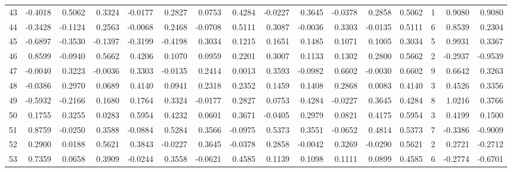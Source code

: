\begin{tabular}{lrrrrrrrrrrrrrrr}
43  &     -0.4018 &  0.5062 &  0.3324 & -0.0177 &  0.2827 &  0.0753 &  0.4284 & -0.0227 &  0.3645 & -0.0378 &   0.2858 &     0.5062 &      1 &                    0.9080 &                     0.9080 \\
44  &     -0.3428 & -0.1124 &  0.2563 & -0.0068 &  0.2468 & -0.0708 &  0.5111 &  0.3087 & -0.0036 &  0.3303 &  -0.0135 &     0.5111 &      6 &                    0.8539 &                     0.2304 \\
45  &     -0.6897 & -0.3530 & -0.1397 & -0.3199 & -0.4198 &  0.3034 &  0.1215 &  0.1651 &  0.1485 &  0.1071 &   0.1005 &     0.3034 &      5 &                    0.9931 &                     0.3367 \\
46  &      0.8599 & -0.0940 &  0.5662 &  0.4206 &  0.1070 &  0.0959 &  0.2201 &  0.3007 &  0.1133 &  0.1302 &   0.2800 &     0.5662 &      2 &                   -0.2937 &                    -0.9539 \\
47  &     -0.0040 &  0.3223 & -0.0036 &  0.3303 & -0.0135 &  0.2414 &  0.0013 &  0.3593 & -0.0982 &  0.6602 &  -0.0030 &     0.6602 &      9 &                    0.6642 &                     0.3263 \\
48  &     -0.0386 &  0.2970 &  0.0689 &  0.4140 &  0.0941 &  0.2318 &  0.2352 &  0.1459 &  0.1408 &  0.2868 &   0.0083 &     0.4140 &      3 &                    0.4526 &                     0.3356 \\
49  &     -0.5932 & -0.2166 &  0.1680 &  0.1764 &  0.3324 & -0.0177 &  0.2827 &  0.0753 &  0.4284 & -0.0227 &   0.3645 &     0.4284 &      8 &                    1.0216 &                     0.3766 \\
50  &      0.1755 &  0.3255 &  0.0283 &  0.5954 &  0.4232 &  0.0601 &  0.3671 & -0.0405 &  0.2979 &  0.0821 &   0.4175 &     0.5954 &      3 &                    0.4199 &                     0.1500 \\
51  &      0.8759 & -0.0250 &  0.3588 & -0.0884 &  0.5284 &  0.3566 & -0.0975 &  0.5373 &  0.3551 & -0.0652 &   0.4814 &     0.5373 &      7 &                   -0.3386 &                    -0.9009 \\
52  &      0.2900 &  0.0188 &  0.5621 &  0.3843 & -0.0227 &  0.3645 & -0.0378 &  0.2858 & -0.0042 &  0.3269 &  -0.0290 &     0.5621 &      2 &                    0.2721 &                    -0.2712 \\
53  &      0.7359 &  0.0658 &  0.3909 & -0.0244 &  0.3558 & -0.0621 &  0.4585 &  0.1139 &  0.1098 &  0.1111 &   0.0899 &     0.4585 &      6 &                   -0.2774 &                    -0.6701 \\

\end{tabular}
